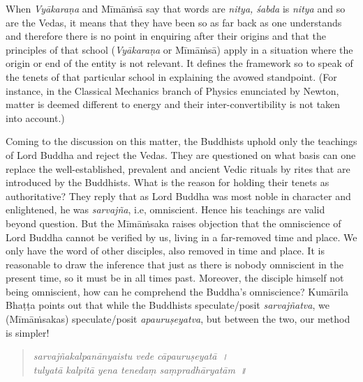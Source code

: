 When \textit{Vyākaraṇa} and Mīmāṁsā say that words are \textit{nitya, śabda} is \textit{nitya} and so are the Vedas, it means that they have been so as far back as one understands and therefore there is no point in enquiring after their origins and that the principles of that school (\textit{Vyākaraṇa} or Mīmāṁsā) apply in a situation where the origin or end of the entity is not relevant. It defines the framework so to speak of the tenets of that particular school in explaining the avowed standpoint. (For instance, in the Classical Mechanics branch of Physics enunciated by Newton, matter is deemed different to energy and their inter-convertibility is not taken into account.)

Coming to the discussion on this matter, the Buddhists uphold only the teachings of Lord Buddha and reject the Vedas. They are questioned on what basis can one replace the well-established, prevalent and ancient Vedic rituals by rites that are introduced by the Buddhists. What is the reason for holding their tenets as authoritative? They reply that as Lord Buddha was most noble in character and enlightened, he was \textit{sarvajña}, i.e, omniscient. Hence his teachings are valid beyond question. But the Mīmāṁsaka raises objection that the omniscience of Lord Buddha cannot be verified by us, living in a far-removed time and place. We only have the word of other disciples, also removed in time and place. It is reasonable to draw the inference that just as there is nobody omniscient in the present time, so it must be in all times past. Moreover, the disciple himself not being omniscient, how can he comprehend the Buddha’s omniscience? Kumārila Bhaṭṭa points out that while the Buddhists speculate/posit \textit{sarvajñatva}, we (Mīmāṁsakas) speculate/posit \textit{apauruṣeyatva}, but between the two, our method is simpler!

\begin{verse}
\textit{sarvajñakalpanānyaistu vede cāpauruṣeyatā~।}\\\textit{tulyatā kalpitā yena tenedaṃ saṃpradhāryatām~॥} 
\end{verse}

